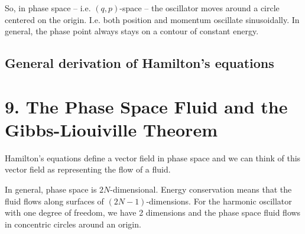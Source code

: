 So, in phase space -- i.e. $(q, p)$-space -- the oscillator moves around a circle centered on the origin. I.e.
both position and momentum oscillate sinusoidally. In general, the phase point always stays on a contour of
constant energy.

\subsection*{General derivation of Hamilton's equations}

\section{9. The Phase Space Fluid and the Gibbs-Liouiville Theorem}

Hamilton's equations define a vector field in phase space and we can think of this vector field as representing the
flow of a fluid.

In general, phase space is $2N$-dimensional. Energy conservation means that the fluid flows along surfaces
of $(2N-1)$-dimensions. For the harmonic oscillator with one degree of freedom, we have 2 dimensions and the
phase space fluid flows in concentric circles around an origin.

